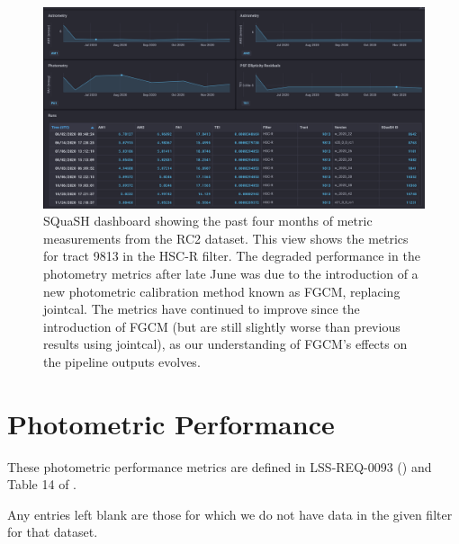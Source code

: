 \documentclass[DM,toc]{lsstdoc}
\begin{document}
\begin{figure}
\includegraphics[width=1.0\columnwidth]{figures/SQuaSH_dashboard_RC2_tract9813.png}
\caption{SQuaSH dashboard showing the past four months of metric measurements from the RC2 dataset. This view shows the metrics for tract 9813 in the HSC-R filter. The degraded performance in the photometry metrics after late June was due to the introduction of a new photometric calibration method known as FGCM, replacing jointcal. The metrics have continued to improve since the introduction of FGCM (but are still slightly worse than previous results using jointcal), as our understanding of FGCM's effects on the pipeline outputs evolves.}
\end{figure}


\section{Photometric Performance}\label{photometric-performance}

These photometric performance
metrics are defined in LSS-REQ-0093 () and Table 14 of .

Any entries left blank are those for which we do not have data in the given filter for that dataset.
\end{document}
